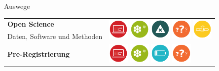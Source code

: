 \documentclass{beamer}
\begin{document}
\begin{frame}{Auswege}

    \vspace{0.5cm}

    \begin{tabular}{>{\raggedright}p{5.5cm}l}
        \textbf{Open Science} & \multirow{2}{2cm}{%
            \includegraphics[width=1cm]{data_dredging}
            \includegraphics[width=1cm]{omitting_null_results}
            \includegraphics[width=1cm]{errors}
            \includegraphics[width=1cm]{underspecified_method}
            \includegraphics[width=1cm]{weak_experimental_design}} \\
        Daten, Software und Methoden & \\[1em]
        \textbf{Pre-Registrierung} & \multirow{2}{2cm}{%
            \includegraphics[width=1cm]{data_dredging}
            \includegraphics[width=1cm]{omitting_null_results}
            \includegraphics[width=1cm]{underpowered_study}
            \includegraphics[width=1cm]{underspecified_method}
}
\end{tabular}
\end{frame}
\end{document}
